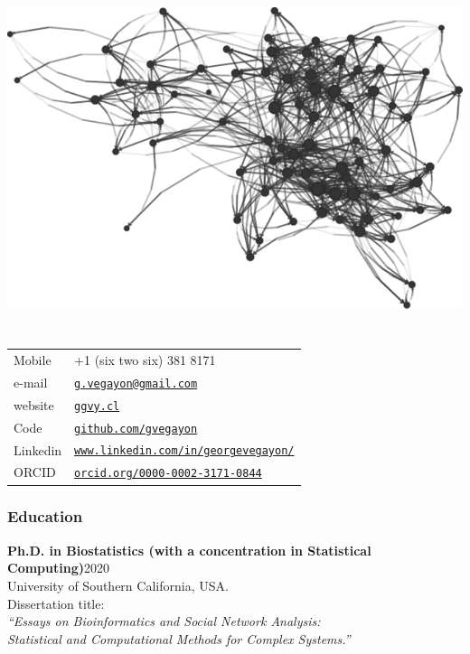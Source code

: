 \documentclass[letterpaper, 10pt]{article}
\def\name{George G. Vega Yon, Ph.D.}
\renewcommand{\bf}{\bfseries\color{teal}}
\begin{document}
\hfill \includegraphics[width=.4\linewidth]{fig/ukfaculty.pdf}\vspace{-6cm}
\part*{\color{darkgray}{\name}}


\begin{minipage}{0.50\linewidth}
  \begin{tabular}{>{}p{.2\linewidth}p{.79\linewidth}}
    Mobile & +1 (six two six) 381 8171 \\
    e-mail & \href{mailto:g.vegayon@gmail.com}{\tt g.vegayon@gmail.com} \\
    website & \href{https://ggvy.cl}{\tt ggvy.cl} \\
    Code & \href{https://github.com/gvegayon}{\tt github.com/gvegayon}\\
    Linkedin & \href{https://www.linkedin.com/in/georgevegayon/}{\tt www.linkedin.com/in/georgevegayon/} \\
    ORCID & \href{https://orcid.org/0000-0002-3171-0844}{\tt orcid.org/0000-0002-3171-0844}
  \end{tabular}
\end{minipage}


\section*{Education}


\noindent 
{\bf Ph.D. in Biostatistics (with a concentration in Statistical Computing)}\hfill 2020\\
University of Southern California, USA.\\
Dissertation title:\\ \hspace*{.5cm}\emph{``Essays on Bioinformatics and Social Network Analysis:\\\hspace*{.75cm}Statistical and Computational Methods for Complex Systems.''}\vspace{.5cm}
\end{document}
